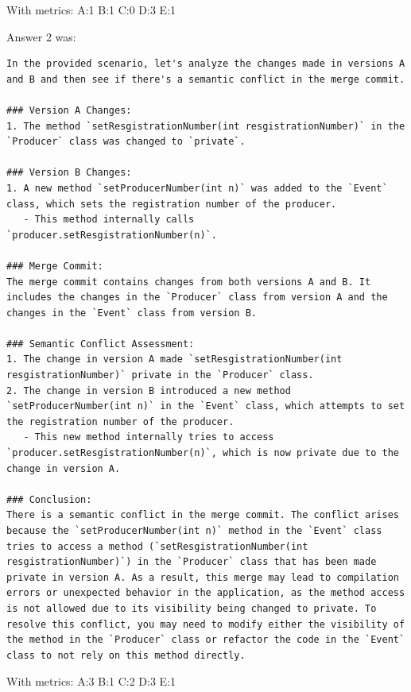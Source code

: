 With metrics:
A:1
B:1
C:0
D:3
E:1

Answer 2 was:
\begin{lstlisting}
In the provided scenario, let's analyze the changes made in versions A and B and then see if there's a semantic conflict in the merge commit.

### Version A Changes:
1. The method `setResgistrationNumber(int resgistrationNumber)` in the `Producer` class was changed to `private`.

### Version B Changes:
1. A new method `setProducerNumber(int n)` was added to the `Event` class, which sets the registration number of the producer.
   - This method internally calls `producer.setResgistrationNumber(n)`.

### Merge Commit:
The merge commit contains changes from both versions A and B. It includes the changes in the `Producer` class from version A and the changes in the `Event` class from version B.

### Semantic Conflict Assessment:
1. The change in version A made `setResgistrationNumber(int resgistrationNumber)` private in the `Producer` class.
2. The change in version B introduced a new method `setProducerNumber(int n)` in the `Event` class, which attempts to set the registration number of the producer.
   - This new method internally tries to access `producer.setResgistrationNumber(n)`, which is now private due to the change in version A.

### Conclusion:
There is a semantic conflict in the merge commit. The conflict arises because the `setProducerNumber(int n)` method in the `Event` class tries to access a method (`setResgistrationNumber(int resgistrationNumber)`) in the `Producer` class that has been made private in version A. As a result, this merge may lead to compilation errors or unexpected behavior in the application, as the method access is not allowed due to its visibility being changed to private. To resolve this conflict, you may need to modify either the visibility of the method in the `Producer` class or refactor the code in the `Event` class to not rely on this method directly.
\end{lstlisting}

With metrics:
A:3
B:1
C:2
D:3
E:1

